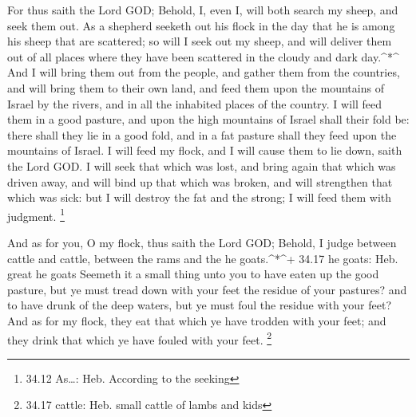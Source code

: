  For thus saith the Lord GOD; Behold, I, even I, will both
search my sheep, and seek them out.  As a shepherd seeketh
out his flock in the day that he is among his sheep that are scattered;
so will I seek out my sheep, and will deliver them out of all places
where they have been scattered in the cloudy and dark day.\^{}*\^{}
 And I will bring them out from the people, and gather them
from the countries, and will bring them to their own land, and feed them
upon the mountains of Israel by the rivers, and in all the inhabited
places of the country.  I will feed them in a good pasture,
and upon the high mountains of Israel shall their fold be: there shall
they lie in a good fold, and in a fat pasture shall they feed upon the
mountains of Israel.  I will feed my flock, and I will
cause them to lie down, saith the Lord GOD.  I will seek
that which was lost, and bring again that which was driven away, and
will bind up that which was broken, and will strengthen that which was
sick: but I will destroy the fat and the strong; I will feed them with
judgment. \footnote{34.12 As\ldots: Heb. According to the seeking}

 And as for you, O my flock, thus saith the Lord GOD;
Behold, I judge between cattle and cattle, between the rams and the he
goats.\^{}*\^{}+ 34.17 he goats: Heb. great he goats 
Seemeth it a small thing unto you to have eaten up the good pasture, but
ye must tread down with your feet the residue of your pastures? and to
have drunk of the deep waters, but ye must foul the residue with your
feet?  And as for my flock, they eat that which ye have
trodden with your feet; and they drink that which ye have fouled with
your feet. \footnote{34.17 cattle: Heb. small cattle of lambs and kids}

